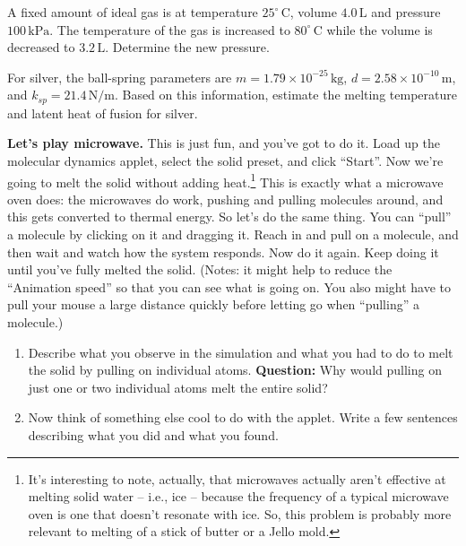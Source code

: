 \begin{exercise}
A fixed amount of ideal gas is at temperature $25^\circ\,\text{C}$,
volume $4.0\,\text{L}$ and pressure $100\,\text{kPa}$.  The temperature
of the gas is increased to $80^\circ\,\text{C}$ while the volume is
decreased to $3.2\,\text{L}$.  Determine the new pressure.
\end{exercise}

\begin{exercise}
  For silver, the ball-spring parameters are $m=1.79\times
  10^{-25}\,\text{kg}$, $d=2.58\times 10^{-10}\,\text{m}$, and
  $k_{sp}=21.4\,\text{N/m}$.  Based on this information, estimate the
  melting temperature and latent heat of fusion for silver.  
\end{exercise}





\begin{exercise} \textbf{Let's play microwave.}  This is just fun, and
  you've got to do it.  Load up the molecular dynamics applet, select
  the solid preset, and click ``Start''.  Now we're going to melt the
  solid without adding heat.\footnote{It's interesting to note,
  actually, that microwaves actually aren't effective at
  melting solid water -- i.e., ice -- because the frequency of
  a typical microwave oven is one that doesn't resonate with ice.
  So, this problem is probably more relevant to melting of a
  stick of butter or a Jello mold.} This is exactly what a microwave oven
  does: the microwaves do work, pushing and pulling molecules around,
  and this gets converted to thermal energy.  So let's do the same
  thing.  You can ``pull'' a molecule by clicking on it and dragging
  it.  Reach in and pull on a molecule, and then wait and watch how the
  system responds.  Now do it again.  Keep doing it until you've fully
  melted the solid.  (Notes: it might help to reduce the ``Animation
  speed'' so that you can see what is going on.  You also might have
  to pull your mouse a large distance quickly before letting go when
  ``pulling'' a molecule.)

\begin{enumerate}
\item Describe what you observe in the simulation and what you had to
  do to melt the solid by pulling on individual atoms.  \textbf{    Question:} Why would pulling on just one or two individual atoms
  melt the entire solid?

\item Now think of something else cool to do with the applet.  Write a
  few sentences describing what you did and what you found.
\end{enumerate}
\end{exercise}


